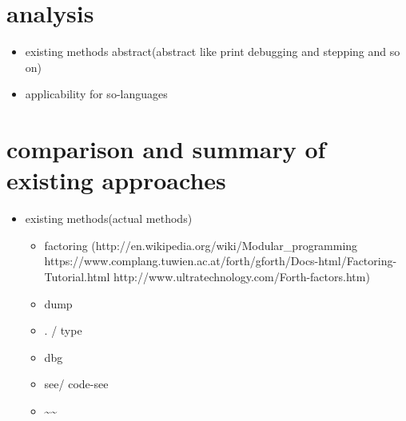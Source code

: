 \section{analysis}

\begin{itemize}
\item existing methods abstract(abstract like print debugging and stepping and so on)
\item applicability for so-languages
\end{itemize}

\section{comparison and summary of existing approaches}

\begin{itemize}
\item existing methods(actual methods)
	\begin{itemize}
	\item factoring (http://en.wikipedia.org/wiki/Modular\_programming https://www.complang.tuwien.ac.at/forth/gforth/Docs-html/Factoring-Tutorial.html http://www.ultratechnology.com/Forth-factors.htm)
	\item dump
	\item . / type
	\item dbg
	\item see/ code-see
	\item \textasciitilde\textasciitilde
	\end{itemize}
\end{itemize}